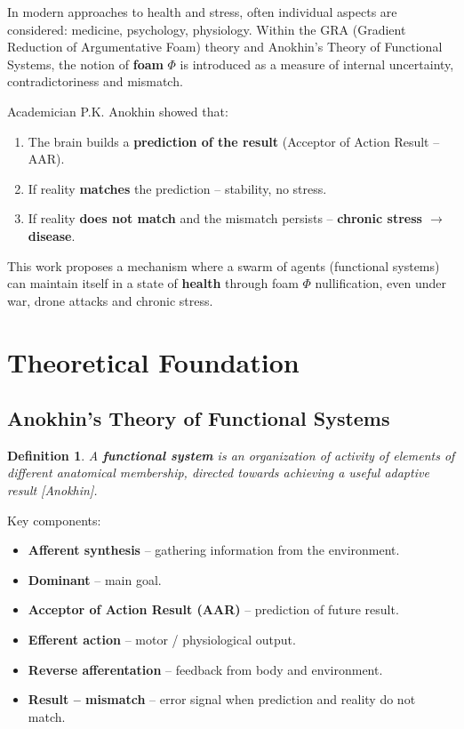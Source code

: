 \documentclass[11pt,a4paper]{article}
\newtheorem{definition}{Definition}
\begin{document}
In modern approaches to health and stress, often individual aspects are considered: medicine, psychology, physiology.
Within the GRA (Gradient Reduction of Argumentative Foam) theory and Anokhin's Theory of Functional Systems, the notion of \textbf{foam} $\Phi$ is introduced as a measure of internal uncertainty, contradictoriness and mismatch.

Academician P.K. Anokhin showed that:
\begin{enumerate}
  \item The brain builds a \textbf{prediction of the result} (Acceptor of Action Result -- AAR).
  \item If reality \textbf{matches} the prediction -- stability, no stress.
  \item If reality \textbf{does not match} and the mismatch persists -- \textbf{chronic stress $\to$ disease}.
\end{enumerate}

This work proposes a mechanism where a swarm of agents (functional systems) can maintain itself in a state of \textbf{health} through foam $\Phi$ nullification, even under war, drone attacks and chronic stress.

\section{Theoretical Foundation}

\subsection{Anokhin's Theory of Functional Systems}

\begin{definition}
A \textbf{functional system} is an organization of activity of elements of different anatomical membership, directed towards achieving a useful adaptive result [Anokhin].
\end{definition}

Key components:
\begin{itemize}
  \item \textbf{Afferent synthesis} -- gathering information from the environment.
  \item \textbf{Dominant} -- main goal.
  \item \textbf{Acceptor of Action Result (AAR)} -- prediction of future result.
  \item \textbf{Efferent action} -- motor / physiological output.
  \item \textbf{Reverse afferentation} -- feedback from body and environment.
  \item \textbf{Result -- mismatch} -- error signal when prediction and reality do not match.
\end{itemize}
\end{document}
